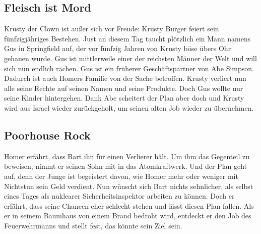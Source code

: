 
\subsection{Fleisch ist Mord}
Krusty der Clown ist außer sich vor Freude: Krusty Burger feiert sein fünfzigjähriges Bestehen. Just an diesem Tag taucht plötzlich ein Mann namens Gus in Springfield auf, der vor fünfzig Jahren von Krusty böse übers Ohr gehauen wurde. Gus ist mittlerweile einer der reichsten Männer der Welt und will sich nun endlich rächen. Gus ist ein früherer Geschäftspartner von Abe Simpson. Dadurch ist auch Homers Familie von der Sache betroffen. Krusty verliert nun alle seine Rechte auf seinen Namen und seine Produkte. Doch Gus wollte nur seine Kinder hintergehen. Dank Abe scheitert der Plan aber doch und Krusty wird aus Israel wieder zurückgeholt, um seinen alten Job wieder zu übernehmen.


\subsection{Poorhouse Rock}
Homer erfährt, dass Bart ihn für einen Verlierer hält. Um ihm das Gegenteil zu beweisen, nimmt er seinen Sohn mit in das Atomkraftwerk. Und der Plan geht auf, denn der Junge ist begeistert davon, wie Homer mehr oder weniger mit Nichtstun sein Geld verdient. Nun wünscht sich Bart nichts sehnlicher, als selbst eines Tages als nuklearer Sicherheitsinspektor arbeiten zu können. Doch er erfährt, dass seine Chancen eher schlecht stehen und lässt diesen Plan fallen. Als er in seinem Baumhaus von einem Brand bedroht wird, entdeckt er den Job des Feuerwehrmanns und stellt fest, das könnte sein Ziel sein.


